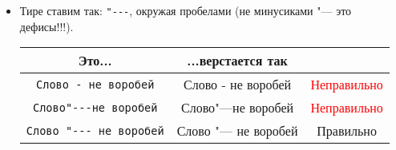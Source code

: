 \documentclass[12pt,a4paper]{book}
\newcommand{\ok}{& \textcolor{green!60!black}{Правильно}}
\newcommand{\bad}{& \textcolor{red}{Неправильно}}
\begin{document}
\begin{enumerate}
\begin{itemize}
\begin{center}
\begin{tabular}{|c|c|c|}
\hline \verb'$<G, \cdot>$' & $<G, \cdot>$ \bad \\
\hline \verb'\langle G, \cdot \rangle' & $\langle G, \cdot \rangle$ \ok \\
\hline \verb'\left<G, \cdot \right>' & $\left<G, \cdot \right>$ \ok \\
\hline \verb'$<a, \cfrac23>$' & $<a, \cfrac23>$ \bad \\
\hline \verb'\langle a, \cfrac23\rangle' & $\langle a, \cfrac23\rangle$ \bad \\
\hline \verb'\left<a, \cfrac23\right>' & $\left<a, \cfrac23\right>$ \ok \\
\hline
\end{tabular}\end{center}
\item Тире ставим так: \verb'"---', окружая пробелами (не минусиками "--- это дефисы!!!).
\begin{center}\begin{tabular}{|c|c|c|}
\hline Это... & ...верстается так & \\
\hline \verb'Слово - не воробей' & Слово - не воробей \bad \\
\hline \verb'Слово"---не воробей' & Слово"---не воробей \bad \\
\hline \verb'Слово "--- не воробей' & Слово "--- не воробей \ok \\
\hline
\end{tabular}\end{center}
\end{itemize}
\end{enumerate}
\end{document}
